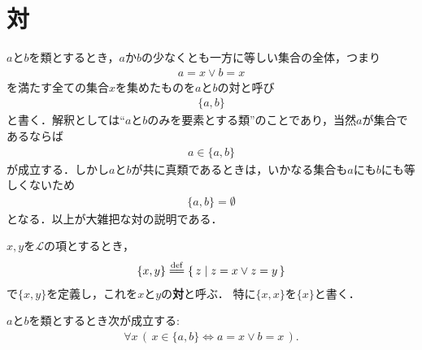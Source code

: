 \section{対}
	$a$と$b$を類とするとき，$a$か$b$の少なくとも一方に等しい集合の全体，つまり
	\begin{align}
		a = x \vee b = x
	\end{align}
	を満たす全ての集合$x$を集めたものを$a$と$b$の対と呼び
	\begin{align}
		\{a,b\}
	\end{align}
	と書く．解釈としては``$a$と$b$のみを要素とする類''のことであり，当然$a$が集合であるならば
	\begin{align}
		a \in \{a,b\}
	\end{align}
	が成立する．しかし$a$と$b$が共に真類であるときは，いかなる集合も$a$にも$b$にも等しくないため
	\begin{align}
		\{a,b\} = \emptyset
	\end{align}
	となる．以上が大雑把な対の説明である．
	
	\begin{screen}
		\begin{dfn}[対]
			$x,y$を$\mathcal{L}$の項とするとき，
			\begin{align}
				\{x,y\} \defeq \Set{z}{z = x \vee z = y}
			\end{align}
			で$\{x,y\}$を定義し，これを$x$と$y$の{\bf 対}と呼ぶ．
			特に$\{x,x\}$を$\{x\}$と書く．
		\end{dfn}
	\end{screen}
	
	\begin{screen}
		\begin{thm}[対は表示されている要素しか持たない]
		\label{thm:pair_members_are_exactly_the_given_two}
			$a$と$b$を類とするとき次が成立する:
			\begin{align}
				\forall x\, (\, x \in \{a,b\} \Longleftrightarrow a=x \vee b=x\, ).
			\end{align}
		\end{thm}
	\end{screen}
	
